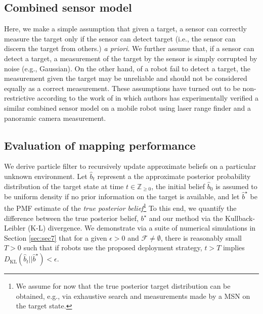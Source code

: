\documentclass[letterpaper, 10 pt, conference]{ieeeconf}
\begin{document}



\subsection{Combined sensor model}
\label{sec:sec24}
Here, we make a simple assumption that given a target, a sensor can correctly measure the target only if the sensor can detect target (i.e., the sensor can discern the target from others.) \emph{a priori}.
We further assume that, if a sensor can detect a target, a measurement of the target by the sensor is simply corrupted by noise (e.g., Gaussian). On the other hand, of a robot fail to detect a target, the measurement given the target may be unreliable and should not be considered equally as a correct measurement. These assumptions have turned out to be non-restrictive according to the work of \cite{anguelov2004detecting} in which authors has experimentally verified a similar combined sensor model 
on a mobile robot using laser range finder and a panoramic camera measurement.

\subsection{Evaluation of mapping performance}
\label{sec:sec25}
We derive particle filter to recursively update approximate beliefs on a particular unknown environment. Let $\hat{b}_t$ represent a the approximate posterior probability distribution of the target state at time $t \in \mathbb{Z}_{\geq 0}$, the initial belief $\hat{b}_0$ is assumed to be uniform density if no prior information on the target is available, and let $\hat{b}^{\star}$ be the PMF estimate of the \emph{true posterior belief}\footnote{We assume for now that the true posterior target distribution can be obtained, e.g., via exhaustive search and measurements made by a MSN on the target state.} 
To this end, we quantify the difference between the true posterior belief, $b^{\star}$ and our method via the Kullback-Leibler (K-L) divergence.
We demonstrate via a suite of numerical simulations in Section \ref{sec:sec7} that for a given $\epsilon>0$ and $\mathcal{F} \neq \emptyset$, there is reasonably small $T >0$ such that if robots use the proposed deployment strategy, $t>T$ implies $D_{\text{KL}}(\hat{b}_{t} || \hat{b}^{\star}) < \epsilon$.
\end{document}
